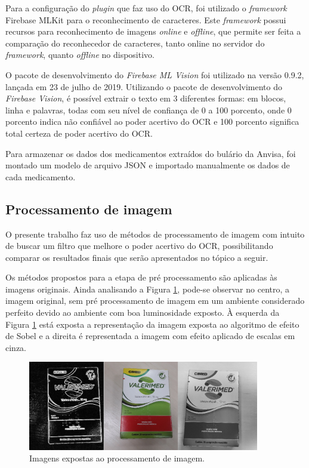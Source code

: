 Para a configuração do \textit{plugin} que faz uso do OCR, foi utilizado o \textit{framework} Firebase MLKit para o reconhecimento de caracteres. Este \textit{framework} possui recursos para reconhecimento de imagens
\textit{online} e \textit{offline},
que permite ser feita a comparação do reconhecedor de caracteres, tanto online no servidor do \textit{framework}, quanto \textit{offline} no dispositivo.

O pacote de desenvolvimento do \textit{Firebase ML Vision} foi utilizado na versão 0.9.2, lançada em 23 de julho de 2019.	Utilizando o pacote de desenvolvimento do \textit{Firebase Vision}, é possível extrair o texto em 3 diferentes formas: em blocos, linha e palavras, todas com seu nível de confiança de 0 a 100 porcento, onde 0 porcento indica não confiável ao poder acertivo do OCR e 100 porcento significa total certeza de poder acertivo do OCR.
 
 Para armazenar os dados dos medicamentos extraídos do bulário da Anvisa, foi montado um modelo de arquivo JSON e importado manualmente os dados de cada medicamento.


\subsection{Processamento de imagem}
O presente trabalho faz uso de métodos de processamento de imagem com intuito de buscar um filtro que melhore o poder acertivo do OCR, possibilitando comparar os resultados finais que serão apresentados no tópico a seguir.

Os métodos propostos para a etapa de pré processamento são aplicadas às imagens originais. Ainda analisando a Figura \ref{tratamentoimg}, pode-se observar no centro, a imagem original, sem pré processamento de imagem em um ambiente considerado perfeito devido ao ambiente com boa luminosidade exposto. À esquerda da Figura \ref{tratamentoimg} está exposta a representação da imagem exposta ao algoritmo de efeito de Sobel e a direita é representada a imagem com efeito aplicado de escalas em cinza.

\begin{figure}[h!]
	\centering
	\includegraphics[width=0.90\textwidth]{Imagens/tratamentoimg.jpg} 
	\caption[Imagens expostas ao processamento de imagem.]{Imagens expostas ao processamento de imagem.}
	\label{tratamentoimg}
\end{figure}